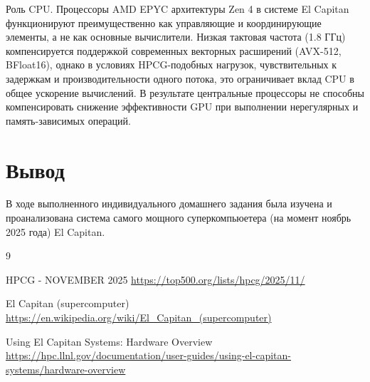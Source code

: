 \documentclass[14pt,a4paper]{extarticle}
\begin{document}
Роль CPU. Процессоры AMD EPYC архитектуры Zen 4 в системе El Capitan
функционируют преимущественно как управляющие и координирующие элементы, а не
как основные вычислители. Низкая тактовая частота (1.8 ГГц) компенсируется
поддержкой современных векторных расширений (AVX-512, BFloat16), однако в
условиях HPCG-подобных нагрузок, чувствительных к задержкам и
производительности одного потока, это ограничивает вклад CPU в общее ускорение
вычислений. В результате центральные процессоры не способны компенсировать
снижение эффективности GPU при выполнении нерегулярных и память-зависимых
операций.

\section{Вывод}

В ходе выполненного индивидуального домашнего задания была изучена и
проанализована система самого мощного суперкомпьюетера (на момент ноябрь 2025
года) El Capitan.

\newpage

\begin{thebibliography}{9}

        HPCG - NOVEMBER 2025
        \url{https://top500.org/lists/hpcg/2025/11/}

        El Capitan (supercomputer)
        \url{https://en.wikipedia.org/wiki/El_Capitan_(supercomputer)}

        Using El Capitan Systems: Hardware Overview
        \url{https://hpc.llnl.gov/documentation/user-guides/using-el-capitan-systems/hardware-overview}
\end{thebibliography}
\end{document}
